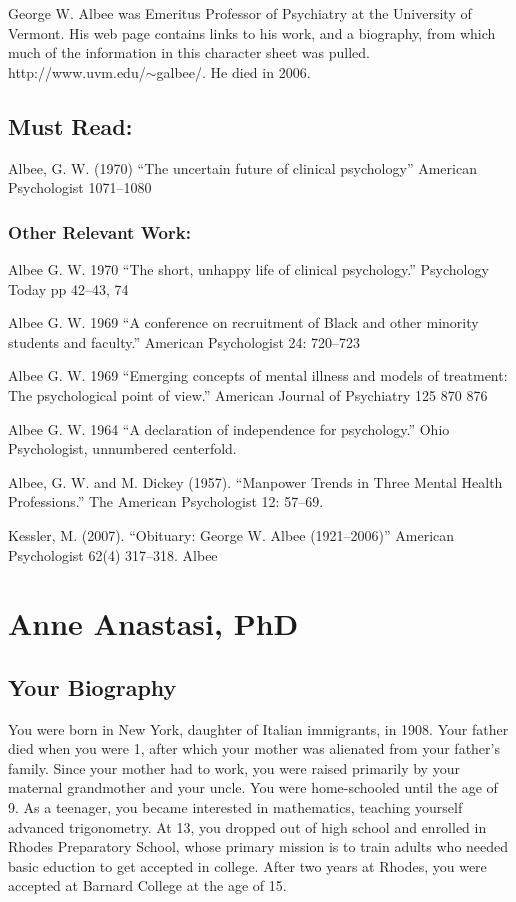 \begin{refsection}
George W. Albee was Emeritus Professor of Psychiatry at the University of Vermont. His web page contains links to his work, and a biography, from which much of the information in this character sheet was pulled. http:\slash \slash www.uvm.edu\slash \ensuremath{\sim}galbee\slash . He died in 2006.

\section{Must Read:}
\label{mustread:}

Albee, G. W. (1970) ``The uncertain future of clinical psychology'' American Psychologist 1071--1080

\subsection{Other Relevant Work:}
\label{otherrelevantwork:}

Albee G. W. 1970 ``The short, unhappy life of clinical psychology.'' Psychology Today pp 42--43, 74

Albee G. W. 1969 ``A conference on recruitment of Black and other minority students and faculty.'' American Psychologist 24: 720--723

Albee G. W. 1969 ``Emerging concepts of mental illness and models of treatment: The psychological point of view.'' American Journal of Psychiatry 125 870 876

Albee G. W. 1964 ``A declaration of independence for psychology.'' Ohio Psychologist, unnumbered centerfold.

Albee, G. W. and M. Dickey (1957). ``Manpower Trends in Three Mental Health Professions.'' The American Psychologist 12: 57--69.

Kessler, M. (2007). ``Obituary: George W. Albee (1921--2006)'' American Psychologist 62(4) 317--318.
Albee

\chapter{Anne Anastasi, PhD}
\label{anneanastasiphd}

\section{Your Biography}
\label{yourbiography}

You were born in New York, daughter of Italian immigrants, in 1908. Your father died when you were 1, after which your mother was alienated from your father's family. Since your mother had to work, you were raised primarily by your maternal grandmother and your uncle. You were home-schooled until the age of 9. As a teenager, you became interested in mathematics, teaching yourself advanced trigonometry. At 13, you dropped out of high school and enrolled in Rhodes Preparatory School, whose primary mission is to train adults who needed basic eduction to get accepted in college. After two years at Rhodes, you were accepted at Barnard College at the age of 15.


\end{refsection}
